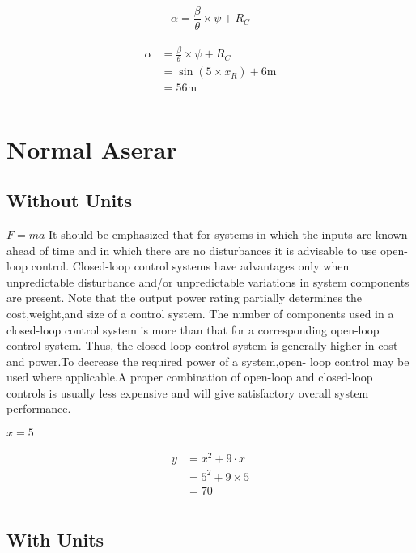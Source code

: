 \documentclass{report}
\begin{document}
\begin{equation}
\alpha = \frac{\beta}{\theta}\times\psi+R_C
\end{equation}

\begin{align}
\begin{split}
\alpha &= \frac{\beta}{\theta}\times\psi+R_C\\
&=\sin{\left(5\times x_R\right)} + 6\mathrm{m}\\
&=56\mathrm{m}\\
\end{split}
\end{align}

\chapter{Normal Aserar}
\section{Without Units}
$F = ma$ It should be emphasized that for systems in which the inputs are known ahead of time and in which there are no disturbances it is advisable to use open-loop control.  Closed-loop control systems have advantages only when unpredictable disturbance  and/or unpredictable variations in system components are present. Note that the  output power rating partially determines the cost,weight,and size of a control system.  The number of components used in a closed-loop control system is more than that for  a corresponding open-loop control system. Thus, the closed-loop control system is generally higher in cost and power.To decrease the required power of a system,open-  loop control may be used where applicable.A proper combination of open-loop and  closed-loop controls is usually less expensive and will give satisfactory overall system  performance.

$x = 5$ 

\begin{align}
\begin{split}
y	&= x^{2} + 9 \cdot x\\
	&= 5^{2} + 9 \times 5\\
	&= 70\\
\end{split}
\end{align}

\section{With Units}
\end{document}
